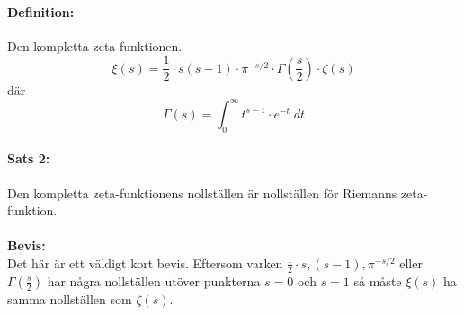 \documentclass{article}%
\begin{document}
\paragraph{Definition:}
Den kompletta zeta-funktionen.\\
$$\xi (s) = \frac 1 2 \cdot s(s - 1) \cdot \pi^{-s/2} \cdot \Gamma(\frac s 2) \cdot \zeta(s) $$
där
$$\Gamma(s) = \int_0^\infty t^{s - 1} \cdot e^{-t}\; dt$$

\pagebreak
\paragraph{Sats 2:} Den kompletta zeta-funktionens nollställen är nollställen för Riemanns zeta-funktion.\\
\\
{\bf Bevis:}\\
Det här är ett väldigt kort bevis. Eftersom varken ${\frac 1 2 \cdot s, (s - 1), \pi^{-s/2}}$ eller $\Gamma(\frac s 2)$
har några nollställen utöver punkterna $s = 0$ och $s = 1$ så måste $\xi(s)$ ha samma nollställen som $\zeta(s)$.
\end{document}
